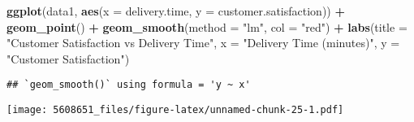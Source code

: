 \documentclass[
]{article}
\newenvironment{Shaded}{\begin{snugshade}}{\end{snugshade}}
\newcommand{\AttributeTok}[1]{\textcolor[rgb]{0.13,0.29,0.53}{#1}}
\newcommand{\FunctionTok}[1]{\textcolor[rgb]{0.13,0.29,0.53}{\textbf{#1}}}
\newcommand{\NormalTok}[1]{#1}
\newcommand{\SpecialCharTok}[1]{\textcolor[rgb]{0.81,0.36,0.00}{\textbf{#1}}}
\newcommand{\StringTok}[1]{\textcolor[rgb]{0.31,0.60,0.02}{#1}}
\begin{document}
\begin{Shaded}
\begin{Highlighting}[]
\FunctionTok{ggplot}\NormalTok{(data1, }\FunctionTok{aes}\NormalTok{(}\AttributeTok{x =}\NormalTok{ delivery.time, }\AttributeTok{y =}\NormalTok{ customer.satisfaction)) }\SpecialCharTok{+}
  \FunctionTok{geom\_point}\NormalTok{() }\SpecialCharTok{+}
  \FunctionTok{geom\_smooth}\NormalTok{(}\AttributeTok{method =} \StringTok{"lm"}\NormalTok{, }\AttributeTok{col =} \StringTok{"red"}\NormalTok{) }\SpecialCharTok{+}
  \FunctionTok{labs}\NormalTok{(}\AttributeTok{title =} \StringTok{"Customer Satisfaction vs Delivery Time"}\NormalTok{,}
       \AttributeTok{x =} \StringTok{"Delivery Time (minutes)"}\NormalTok{,}
       \AttributeTok{y =} \StringTok{"Customer Satisfaction"}\NormalTok{)}
\end{Highlighting}
\end{Shaded}

\begin{verbatim}
## `geom_smooth()` using formula = 'y ~ x'
\end{verbatim}

\texttt{[image: 5608651\_files/figure-latex/unnamed-chunk-25-1.pdf]}
\end{document}

